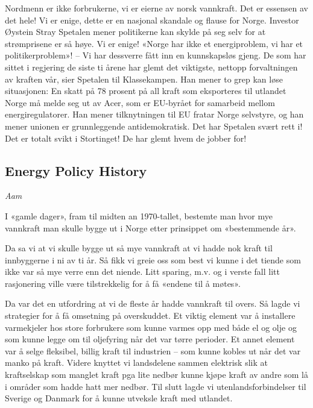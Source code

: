 \documentclass[
]{book}
\begin{document}
Nordmenn er ikke forbrukerne, vi er eierne av norsk vannkraft. Det er essensen av det hele!
Vi er enige, dette er en nasjonal skandale og flause for Norge.
Investor Øystein Stray Spetalen mener politikerne kan skylde på seg selv for at strømprisene er så høye. Vi er enige!
«Norge har ikke et energiproblem, vi har et politikerproblem»!
-- Vi har dessverre fått inn en kunnskapsløs gjeng. De som har sittet i regjering de siste ti årene har glemt det viktigste, nettopp forvaltningen av kraften vår, sier Spetalen til Klassekampen.
Han mener to grep kan løse situasjonen:
En skatt på 78 prosent på all kraft som eksporteres til utlandet
Norge må melde seg ut av Acer, som er EU-byrået for samarbeid mellom energiregulatorer.
Han mener tilknytningen til EU fratar Norge selvstyre, og han mener unionen er grunnleggende antidemokratisk.
Det har Spetalen svært rett i! Det er totalt svikt i Stortinget! De har glemt hvem de jobber for!

\hypertarget{energy-policy-history}{%
\subsection{Energy Policy History}\label{energy-policy-history}}

\emph{Aam}

I «gamle dager», fram til midten an 1970-tallet, bestemte man hvor mye vannkraft man skulle bygge ut i Norge etter prinsippet om «bestemmende år».

Da sa vi at vi skulle bygge ut så mye vannkraft at vi hadde nok kraft til innbyggerne i ni av ti år. Så fikk vi greie oss som best vi kunne i det tiende som ikke var så mye verre enn det niende. Litt sparing, m.v. og i verste fall litt rasjonering ville være tilstrekkelig for å få «endene til å møtes».

Da var det en utfordring at vi de fleste år hadde vannkraft til overs. Så lagde vi strategier for å få omsetning på overskuddet. Et viktig element var å installere varmekjeler hos store forbrukere som kunne varmes opp med både el og olje og som kunne legge om til oljefyring når det var tørre perioder. Et annet element var å selge fleksibel, billig kraft til industrien -- som kunne kobles ut når det var manko på kraft. Videre knyttet vi landsdelene sammen elektrisk slik at kraftselskap som manglet kraft pga lite nedbør kunne kjøpe kraft av andre som lå i områder som hadde hatt mer nedbør. Til slutt lagde vi utenlandsforbindelser til Sverige og Danmark for å kunne utveksle kraft med utlandet.
\end{document}
